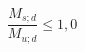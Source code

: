\documentclass[12pt]{article}
\begin{document}
\begin{displaymath}
\frac {M_{s;d}} {M_{u;d}} \leq 1,0
\end{displaymath}
\end{document}
